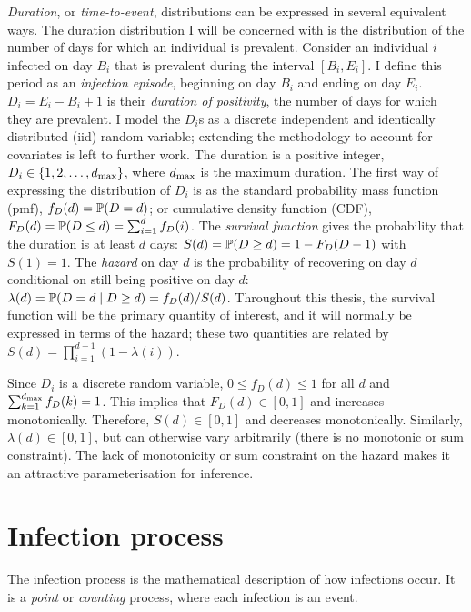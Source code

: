 \documentclass[thesis.tex]{subfiles}
\begin{document}
\emph{Duration}, or \emph{time-to-event}, distributions can be expressed in several equivalent ways.
The duration distribution I will be concerned with is the distribution of the number of days for which an individual is prevalent.
Consider an individual $i$ infected on day $B_i$ that is prevalent during the interval $[B_i, E_i]$.
I define this period as an \emph{infection episode}, beginning on day $B_i$ and ending on day $E_i$.
$D_i = E_i - B_i + 1$ is their \emph{duration of positivity}, the number of days for which they are prevalent.
I model the $D_i$s as a discrete independent and identically distributed (iid) random variable; extending the methodology to account for covariates is left to further work.
The duration is a positive integer, \ie $D_i \in \{1, 2, \dots, d_\text{max} \}$, where $d_\text{max}$ is the maximum duration.
The first way of expressing the distribution of $D_i$ is as the standard probability mass function (pmf), $f_{D}(d) = \operatorname{\mathbb{P}}(D = d)$; or cumulative density function (CDF), $F_{D}(d) = \operatorname{\mathbb{P}}(D \leq d) = \sum_{i=1}^d f_{D}(i)$.
The \emph{survival function} gives the probability that the duration is at least $d$ days: $S(d) = \operatorname{\mathbb{P}}(D \geq d) = 1 - F_{D}(D - 1)$ with $S(1) = 1$.
The \emph{hazard} on day $d$ is the probability of recovering on day $d$ conditional on still being positive on day $d$: $\lambda(d) = \operatorname{\mathbb{P}}(D = d \mid D \geq d) = f_{D}(d) / S(d)$.
Throughout this thesis, the survival function will be the primary quantity of interest, and it will normally be expressed in terms of the hazard; these two quantities are related by $S(d) = \prod_{i=1}^{d-1} (1 - \lambda(i))$.

Since $D_i$ is a discrete random variable, $0 \leq f_D(d) \leq 1$ for all $d$ and $\sum_{k=1}^{d_\text{max}} f_D(k) = 1$.
This implies that $F_D(d) \in [0, 1]$ and increases monotonically.
Therefore, $S(d) \in [0, 1]$ and decreases monotonically.
Similarly, $\lambda(d) \in [0,1]$, but can otherwise vary arbitrarily (\ie there is no monotonic or sum constraint).
The lack of monotonicity or sum constraint on the hazard makes it an attractive parameterisation for inference.

\section{Infection process} \label{inc-prev:sec:infection-process}
The infection process is the mathematical description of how infections occur.
It is a \emph{point} or \emph{counting} process, where each infection is an event.
\end{document}
